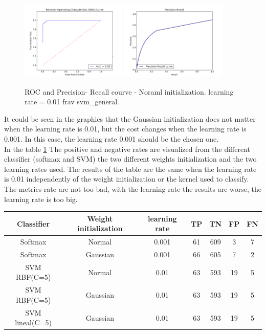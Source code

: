 \begin{figure}[htb]
\centering
\includegraphics[width=0.45\textwidth]{images/FRAv_casia_ImageNet/Imagenet2/frav/frav1/ROC.png}
\includegraphics[width=0.45\textwidth]{images/FRAv_casia_ImageNet/Imagenet2/frav/svm_general/Precision-Recall.png}
\caption{ROC and Precision- Recall courve - Noraml initialization. learning rate = 0.01 frav svm\_general.} \label{fig:Imagenet2-frav-frav1ROC}
\end{figure}

It could be seen in the graphics that the Gaussian initialization does not matter when the learning rate is 0.01, but the cost changes when the learning rate is 0.001. In this case, the learning rate 0.001 should be the chosen one.\\

In the table \ref{fravv} The positive and negative rates are visualized from the different classifier (softmax and SVM) the two different weights initialization and the two learning rates used. The results of the table are the same when the learning rate is 0.01 independently of the weight initialization or the kernel used to classify. The metrics rate are not too bad, with the learning rate the results are worse, the learning rate is too big.\\

\begin{table}[htb]
\centering
\begin{tabular}{|ccccccc|}
\hline
Classifier &  Weight initialization & learning rate & TP  & TN  & FP  & FN \\ \hline
Softmax    &         Normal        &     0.001     & 61  & 609 &  3  & 7  \\
Softmax    &       Gaussian        &     0.001     & 66  & 605 &  7  & 2   \\
SVM RBF(C=5)&         Normal       &     0.01      & 63  & 593 & 19  & 5  \\
SVM RBF(C=5)&         Gaussian     &     0.01      &  63 & 593 & 19  &5  \\
SVM lineal(C=5)&      Gaussian     &     0.01      &  63 & 593 & 19  &5  \\
\hline
\end{tabular} \label{fravv}

\end{table}


